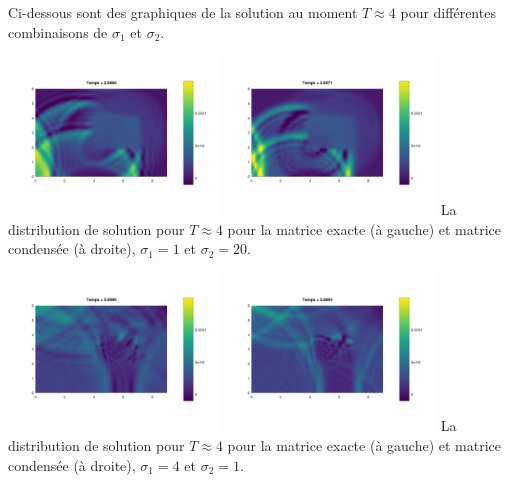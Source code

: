 \documentclass[12pt]{article}
\begin{document}
Ci-dessous sont des graphiques de la solution au moment $T \approx 4$ pour différentes combinaisons de $\sigma_1$ et $\sigma_2$.
\begin{center}
	\hspace{1cm}\includegraphics[width=0.42\textwidth]{images/u_deux_mil_1_20}\hspace{1cm}
	\includegraphics[width=0.42\textwidth]{images/u_deux_mil_1_20_cond}\hspace{1cm}
 {La distribution de solution pour $T \approx 4$ pour la matrice exacte (à gauche) et matrice condensée (à droite), $\sigma_1 = 1$ et $\sigma_2 = 20$.}
\end{center}
\begin{center}
	\hspace{1cm}\includegraphics[width=0.42\textwidth]{images/u_deux_mil_4_1}\hspace{1cm}
	\includegraphics[width=0.42\textwidth]{images/u_deux_mil_4_1_cond}\hspace{1cm}
	{La distribution de solution pour $T \approx 4$ pour la matrice exacte (à gauche) et matrice condensée (à droite), $\sigma_1 = 4$ et $\sigma_2 = 1$.}
\end{center}
\end{document}
